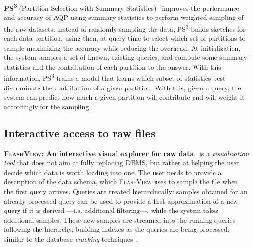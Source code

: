 \medskip

\newcommand{\PScube}{PS\textsuperscript{3}\xspace}

\textbf{\PScube} (Partition Selection with Summary Statistics)~\cite{rong_approximate_2020}
improves the performance and accuracy of \gls{AQP} using summary statistics to perform weighted sampling
of the raw datasets: instead of randomly sampling the data, \PScube builds sketches for each data
partition, using them at query time to select which set of partitions to sample maximizing the accuracy
while reducing the overhead. At initialization, the system samples a set of known, existing queries,
and compute some summary statistics and the contribution of each partition to the answer. With this information,
\PScube trains a model that learns which subset of statistics best discriminate the contribution
of a given partition. With this, given a query, the system can predict how much a given partition will
contribute and will weight it accordingly for the sampling.


\subsection{Interactive access to raw files}

\textbf{\textsc{FlashView}: An interactive visual explorer for raw data}~\cite{pang_flashview_2017}
is a \emph{visualization tool} that does not aim at fully replacing \gls{DBMS}, but rather
at helping the user decide which data is worth loading into one. The user needs to provide
a description of the data schema, which \textsc{FlashView} uses to sample the file when the first query
arrives. Queries are treated hierarchically: samples obtained for an already processed query can be
used to provide a first approximation of a new query if it is derived ---i.e. additional filtering---,
while the system takes additional samples. These new samples are streamed into the running queries following
the hierarchy, building indexes as the queries are being processed, similar to the database
\emph{cracking} techniques~\cite{Idreos2007}.

\medskip

